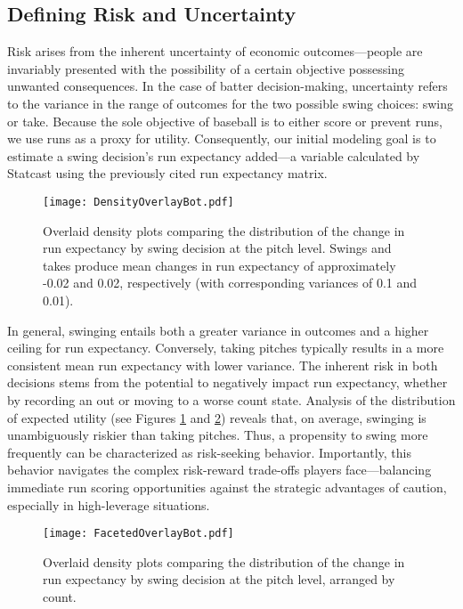 \documentclass[12pt]{article}
\numberwithin{equation}{section}
\begin{document}
\subsection{Defining Risk and Uncertainty}

Risk arises from the inherent uncertainty of economic outcomes---people are invariably presented with the possibility of a certain objective possessing unwanted consequences. In the case of batter decision-making, uncertainty refers to the variance in the range of outcomes for the two possible swing choices: swing or take. Because the sole objective of baseball is to either score or prevent runs, we use runs as a proxy for utility. Consequently, our initial modeling goal is to estimate a swing decision’s run expectancy added---a variable calculated by Statcast using the previously cited run expectancy matrix.

\vspace{5mm} %

\begin{figure}[H]
    \centering
    \texttt{[image: DensityOverlayBot.pdf]}
    \caption{Overlaid density plots comparing the distribution of the change in run expectancy by swing decision at the pitch level. Swings and takes produce mean changes in run expectancy of approximately -0.02 and 0.02, respectively (with corresponding variances of 0.1 and 0.01).}
    \label{fig:SwingOverlayOverall}
\end{figure}

In general, swinging entails both a greater variance in outcomes and a higher ceiling for run expectancy. Conversely, taking pitches typically results in a more consistent mean run expectancy with lower variance. The inherent risk in both decisions stems from the potential to negatively impact run expectancy, whether by recording an out or moving to a worse count state. Analysis of the distribution of expected utility (see Figures \ref{fig:SwingOverlayOverall} and \ref{fig:CountOverlay}) reveals that, on average, swinging is unambiguously riskier than taking pitches. Thus, a propensity to swing more frequently can be characterized as risk-seeking behavior. Importantly, this behavior navigates the complex risk-reward trade-offs players face---balancing immediate run scoring opportunities against the strategic advantages of caution, especially in high-leverage situations.

\begin{figure}[H]
    \centering
    \texttt{[image: FacetedOverlayBot.pdf]}
    \caption{Overlaid density plots comparing the distribution of the change in run expectancy by swing decision at the pitch level, arranged by count.}
    \label{fig:CountOverlay}
\end{figure}
\end{document}

